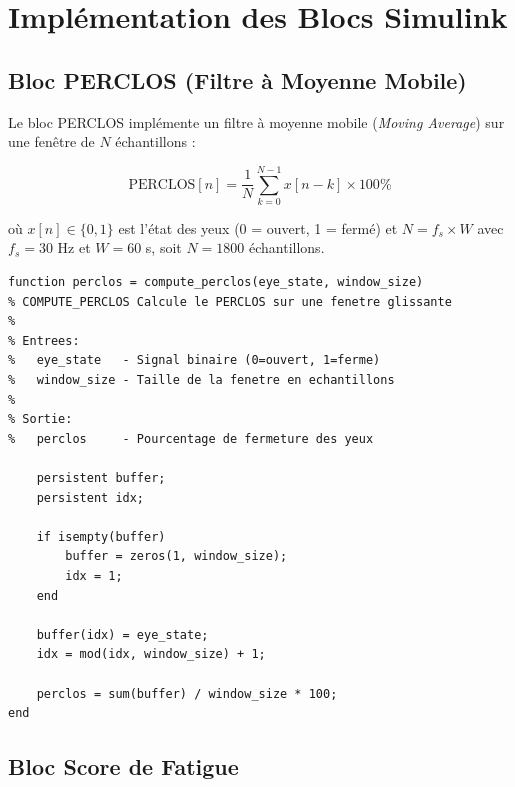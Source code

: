 \documentclass[12pt,a4paper,twoside]{report}
\begin{document}
\section{Implémentation des Blocs Simulink}

\subsection{Bloc PERCLOS (Filtre à Moyenne Mobile)}

Le bloc PERCLOS implémente un filtre à moyenne mobile (\textit{Moving Average}) sur une fenêtre de $N$ échantillons :

\begin{equation}
\text{PERCLOS}[n] = \frac{1}{N} \sum_{k=0}^{N-1} x[n - k] \times 100\%
\label{eq:perclos_simulink}
\end{equation}

où $x[n] \in \{0, 1\}$ est l'état des yeux (0 = ouvert, 1 = fermé) et $N = f_s \times W$ avec $f_s = 30$ Hz et $W = 60$ s, soit $N = 1800$ échantillons.

\begin{lstlisting}[style=matlabstyle, caption={Implémentation du bloc PERCLOS en MATLAB.}, label={lst:perclos_matlab}]
function perclos = compute_perclos(eye_state, window_size)
% COMPUTE_PERCLOS Calcule le PERCLOS sur une fenetre glissante
%
% Entrees:
%   eye_state   - Signal binaire (0=ouvert, 1=ferme)
%   window_size - Taille de la fenetre en echantillons
%
% Sortie:
%   perclos     - Pourcentage de fermeture des yeux

    persistent buffer;
    persistent idx;
    
    if isempty(buffer)
        buffer = zeros(1, window_size);
        idx = 1;
    end
    
    buffer(idx) = eye_state;
    idx = mod(idx, window_size) + 1;
    
    perclos = sum(buffer) / window_size * 100;
end
\end{lstlisting}

\subsection{Bloc Score de Fatigue}
\end{document}
